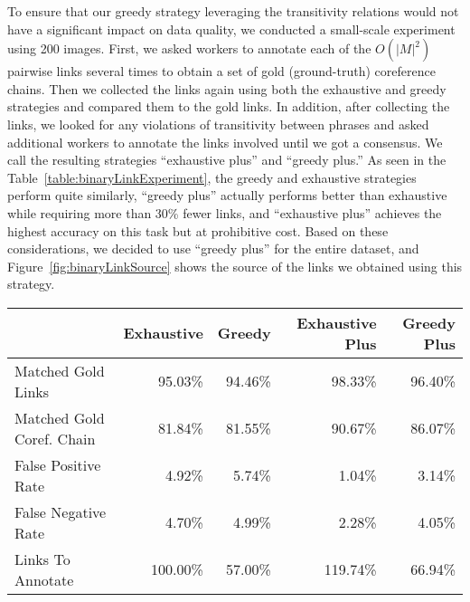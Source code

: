 \documentclass[twocolumn]{svjour3}
\begin{document}
To ensure that our greedy strategy leveraging the transitivity relations would not have a significant impact on data quality, we conducted a small-scale experiment using 200 images.  First, we asked workers to annotate each of the $O(|M|^{2})$ pairwise links several times to obtain a set of gold (ground-truth) coreference chains.  Then we collected the links again using both the exhaustive and greedy strategies and compared them to the gold links. In addition, after collecting the links, we looked for any violations of transitivity between phrases and asked additional workers to annotate the links involved until we got a consensus. We call the resulting strategies ``exhaustive plus'' and ``greedy plus.'' As seen in the Table~\ref{table:binaryLinkExperiment}, the greedy and exhaustive strategies perform quite similarly, ``greedy plus'' actually performs better than exhaustive while requiring more than 30\% fewer links, and ``exhaustive plus'' achieves the highest accuracy on this task but at prohibitive cost. Based on these considerations, we decided to use ``greedy plus'' for the entire dataset, and Figure~\ref{fig:binaryLinkSource} shows the source of the links we obtained using this strategy. 

\begin{table*}
\caption{Comparison of different annotation strategies for collecting binary coreference links on 200 images.  We report the false positive/negative rates for the individual binary link judgments, as well as how many of the coreference chains created by the different strategies matched the gold coreference chains.}
\label{table:binaryLinkExperiment}
\begin{tabular}{|l|r|r|r|r|}
\hline
 & Exhaustive & Greedy & Exhaustive Plus & Greedy Plus \\
\hline
\hline
Matched Gold Links & 95.03\% & 94.46\% & 98.33\% & 96.40\% \\
Matched Gold Coref. Chain & 81.84\% & 81.55\% & 90.67\% & 86.07\% \\
False Positive Rate & 4.92\% & 5.74\%  & 1.04\% & 3.14\% \\
False Negative Rate & 4.70\% & 4.99\% & 2.28\% & 4.05\% \\
\hline
Links To Annotate & 100.00\% & 57.00\% & 119.74\% & 66.94\%\\
\hline
\end{tabular}
\end{table*}
\end{document}
